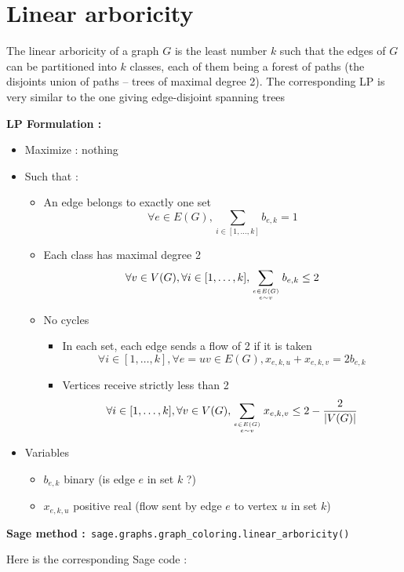 
\section{Linear arboricity}
The linear arboricity of a graph $G$ is the least number $k$ such that the edges of $G$ can be partitioned into $k$ classes, each of them being a forest of paths (the disjoints union of paths -- trees of maximal degree 2). The corresponding LP is very similar to the one giving edge-disjoint spanning trees

{\bf LP Formulation :}
\begin{itemize}
\item Maximize : nothing
\item Such that :
  \begin{itemize}
  \item An edge belongs to exactly one set
    $$\forall e\in E(G), \sum_{i\in [1,\dots,k]} b_{e,k}  = 1$$
  \item Each class has maximal degree 2
    $$\forall v\in V(G), \forall i\in [1,\dots,k], \sum_{e\in E(G)\atop e\sim v} b_{e,k}\leq 2$$
  \item No cycles
    \begin{itemize}
    \item In each set, each edge sends a flow of 2 if it is taken
      $$\forall i\in [1,\dots,k], \forall e=uv\in E(G), x_{e,k,u} + x_{e,k,v} = 2b_{e,k}$$
    \item Vertices receive strictly less than 2
      $$\forall i\in [1,\dots,k], \forall v\in V(G), \sum_{e\in E(G)\atop e\sim v}x_{e,k,v}\leq 2-\frac 2 {|V(G)|}$$
    \end{itemize}
  \end{itemize}
\item Variables
  \begin{itemize}
  \item $b_{e,k}$ binary (is edge $e$ in set $k$ ?)
  \item $ x_{e,k,u}$ positive real (flow sent by edge $e$ to vertex $u$ in set $k$)
  \end{itemize}
\end{itemize}

{\bf Sage method :}\verb! sage.graphs.graph_coloring.linear_arboricity()!

Here is the corresponding Sage code :

